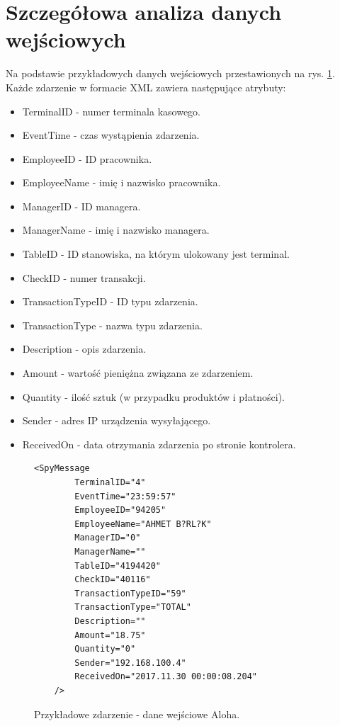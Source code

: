 \documentclass[a4paper]{book}
\begin{document}
\section{Szczegółowa analiza danych wejściowych}
Na podstawie przykładowych danych wejściowych przestawionych na rys. \ref{lst:przykladoweZdarzenieAloha2}. Każde zdarzenie w formacie XML zawiera następujące atrybuty:
\begin{itemize}
	\item TerminalID - numer terminala kasowego.
	\item EventTime - czas wystąpienia zdarzenia.
	\item EmployeeID - ID pracownika.
	\item EmployeeName - imię i nazwisko pracownika.
	\item ManagerID - ID managera.
	\item ManagerName - imię i nazwisko managera.
	\item TableID - ID stanowiska, na którym ulokowany jest terminal.
	\item CheckID - numer transakcji.
	\item TransactionTypeID - ID typu zdarzenia.
	\item TransactionType - nazwa typu zdarzenia.
	\item Description - opis zdarzenia.
	\item Amount - wartość pieniężna związana ze zdarzeniem.
	\item Quantity - ilość sztuk (w przypadku produktów i płatności).
	\item Sender - adres IP urządzenia wysyłającego.
	\item ReceivedOn - data otrzymania zdarzenia po stronie kontrolera.
\end{itemize}
\begin{figure}[t]
	\begin{lstlisting}[frame=single, breaklines=true, numbers=none]
	<SpyMessage 
		TerminalID="4" 
		EventTime="23:59:57" 
		EmployeeID="94205" 
		EmployeeName="AHMET B?RL?K" 
		ManagerID="0" 
		ManagerName="" 
		TableID="4194420" 
		CheckID="40116" 
		TransactionTypeID="59" 
		TransactionType="TOTAL" 
		Description="" 
		Amount="18.75" 
		Quantity="0" 
		Sender="192.168.100.4" 
		ReceivedOn="2017.11.30 00:00:08.204" 
	/>
	\end{lstlisting}
	\caption{Przykładowe zdarzenie - dane wejściowe Aloha.}
	\label{lst:przykladoweZdarzenieAloha2}
\end{figure}
\end{document}
